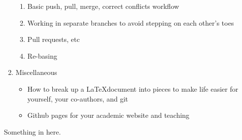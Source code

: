 \documentclass[12pt,letterpaper]{article}
\begin{document}
\begin{enumerate}
\begin{enumerate}
			\item Basic push, pull, merge, correct conflicts workflow
			\item Working in separate branches to avoid stepping on each other's toes
			\item Pull requests, etc 
			\item Re-basing
		\end{enumerate}
	\item Miscellaneous
		\begin{itemize}
			\item How to break up a \LaTeX document into pieces to make life easier for yourself, your co-authors, and git
			\item Github pages for your academic website and teaching
		\end{itemize}
\end{enumerate}
Something in here.	
\end{document}
